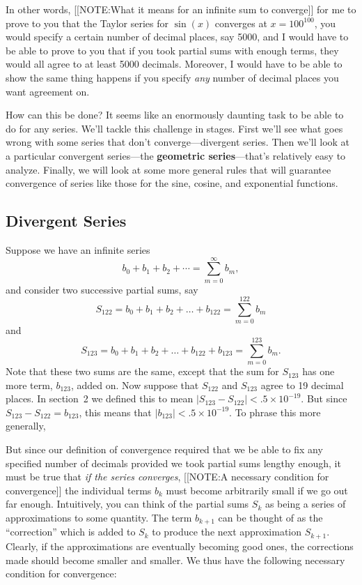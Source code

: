 In other words, 
[[NOTE:What it means for  an infinite sum  to converge]]
for me to prove to you that the Taylor series for $\sin(x)$ converges
at $x=100^{100}$, you would specify a certain number of decimal
places, say 5000, and I would have to be able to prove to you that if
you took partial sums with enough terms, they would all agree to at
least 5000 decimals.  Moreover, I would have to be able to show the
same thing happens if you specify {\em any} number of decimal places
you want agreement on.

How can this be done?  It seems like an enormously daunting task to be
able to do for any series.  We'll tackle this challenge in stages.
First we'll see what goes wrong with some series that don't
converge---divergent series.  Then we'll look at a particular
convergent series---the {\bf geometric series}---that's relatively
easy to analyze.  Finally, we will look at some more general rules
that will guarantee convergence of series like those for the sine,
cosine, and exponential functions.


\subsection{Divergent Series}
\label{subsec:divergent-series}

Suppose we have an infinite series
\[
b_0 + b_1 + b_2 + \cdots = \sum_{m=0}^\infty b_m,
\]
and consider two successive partial sums, say
\[
S_{122}=b_0 + b_1 + b_2 + \ldots+b_{122}=\sum_{m=0}^{122} b_m
\]
and
\[
S_{123}=b_0 + b_1 + b_2 + \ldots+b_{122}+b_{123}=\sum_{m=0}^{123} b_m.
\]
Note that these two sums are the same, except that the sum for
$S_{123}$ has one more term, $b_{123}$, added on.  Now suppose that
$S_{122}$ and $S_{123}$ agree to 19 decimal places.  In section~2 we
defined this to mean $|S_{123}-S_{122}|<.5 \times 10^{-19}$.  But
since $S_{123}-S_{122}=b_{123}$, this means that $|b_{123}|<.5 \times
10^{-19}$.  To phrase this more generally,


\begin{center}
\end{center}


But since our definition of convergence required that we be able to
fix any specified number of decimals provided we took partial sums
lengthy enough, it must be true that {\em if the series converges},
[[NOTE:A necessary condition for convergence]]
the individual terms $b_k$ must become arbitrarily small if we go out
far enough. Intuitively, you can think of the partial sums $S_k$ as
being a series of approximations to some quantity.  The term $b_{k+1}$
can be thought of as the ``correction'' which is added to $S_k$ to
produce the next approximation $S_{k+1}$.  Clearly, if the
approximations are eventually becoming good ones, the corrections made
should become smaller and smaller.  We thus have the following
necessary condition for convergence:



